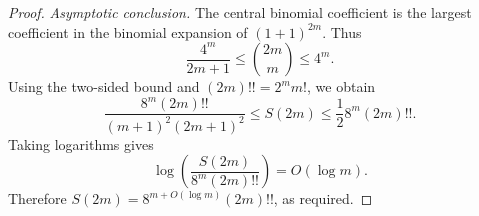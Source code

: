 \documentclass[12pt]{article}
\theoremstyle{definition}
\newcommand{\1}{\mathbf 1}
\begin{document}
\begin{proof}
\medskip
\noindent\emph{Asymptotic conclusion.}
The central binomial coefficient is the largest coefficient in the
binomial expansion of $(1+1)^{2m}$. Thus
$$
\frac{4^m}{2m+1}\leq\binom{2m}{m}\leq 4^m.
$$
Using the two-sided bound and $(2m)!!=2^m m!$, we obtain
$$
\frac{8^m(2m)!!}{(m+1)^2(2m+1)^2}
\leq S(2m)\leq\frac{1}{2} 8^m(2m)!!.
$$
Taking logarithms gives
$$
\log\!\left(\frac{S(2m)}{8^m(2m)!!}\right)=O(\log m).
$$
Therefore $S(2m)=8^{m+O(\log m)}(2m)!!$, as required.
\end{proof}
\end{document}
